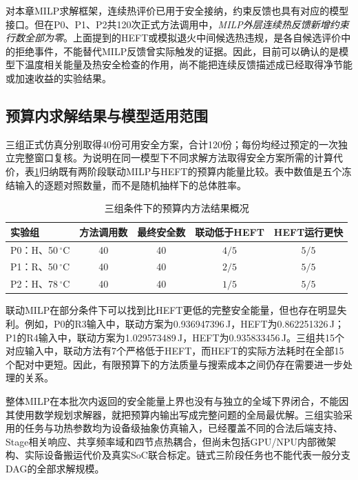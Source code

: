 对本章MILP求解框架，连续热评价已用于安全接纳，约束反馈也具有对应的模型接口。但在P0、P1、P2共120次正式方法调用中，\emph{MILP外层连续热反馈新增约束行数全部为零}。上面提到的HEFT或模拟退火中间候选热违规，是各自候选评价中的拒绝事件，不能替代MILP反馈曾实际触发的证据。因此，目前可以确认的是模型下温度相关能量及热安全检查的作用，尚不能把连续反馈描述成已经取得净节能或加速收益的实验结果。


\subsection{预算内求解结果与模型适用范围}

三组正式仿真分别取得40份可用安全方案，合计120份；每份均经过预定的一次独立完整窗口复核。为说明在同一模型下不同求解方法取得安全方案所需的计算代价，表\ref{tab:c3-budget}归纳既有两阶段联动MILP与HEFT的预算内能量比较。表中数值是五个冻结输入的逐题对照数量，而不是随机抽样下的总体胜率。

\begin{table}[htbp]
 \centering
 \caption{三组条件下的预算内方法结果概况}
 \label{tab:c3-budget}
 \begin{tabular}{lcccc}
 \toprule
 实验组 & 方法调用数 & 最终安全数 & 联动低于HEFT & HEFT运行更快\\
 \midrule
 P0：H、50\,$^\circ$C & 40 & 40 & $4/5$ & $5/5$\\
 P1：R、50\,$^\circ$C & 40 & 40 & $2/5$ & $5/5$\\
 P2：H、78\,$^\circ$C & 40 & 40 & $1/5$ & $5/5$\\
 \bottomrule
 \end{tabular}
\end{table}

联动MILP在部分条件下可以找到比HEFT更低的完整安全能量，但也存在明显失利。例如，P0的R3输入中，联动方案为0.936947396\,J，HEFT为0.862251326\,J；P1的R4输入中，联动方案为1.029573489\,J，HEFT为0.935833456\,J。三组共15个对应输入中，联动方法有7个严格低于HEFT，而HEFT的实际方法耗时在全部15个配对中更短。因此，有限预算下的方法质量与搜索成本之间仍存在需要进一步处理的关系。

整体MILP在本批次内返回的安全能量上界也没有与独立的全域下界闭合，不能因其使用数学规划求解器，就把预算内输出写成完整问题的全局最优解。三组实验采用的任务与功热参数均为设备级抽象仿真输入，已经覆盖不同的合法后端支持、Stage相关响应、共享频率域和四节点热耦合，但尚未包括GPU/NPU内部微架构、实际设备搬运代价及真实SoC联合标定。链式三阶段任务也不能代表一般分支DAG的全部求解规模。

